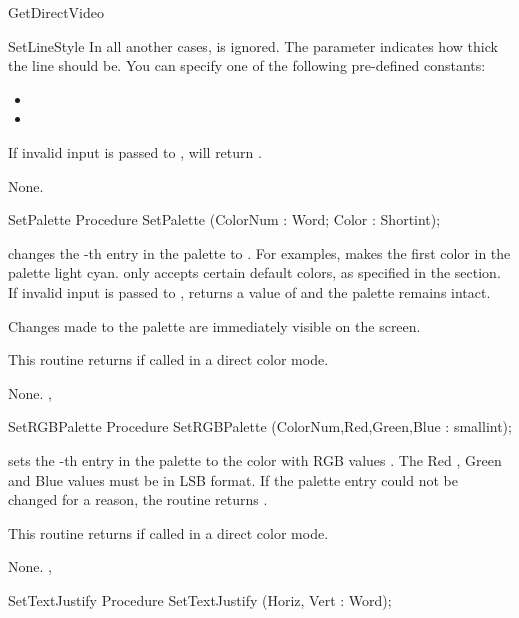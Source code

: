 \begin{function}{GetDirectVideo}
\begin{procedure}{SetLineStyle}
In all another cases,  is ignored. The parameter 
indicates how thick the line should be. You can specify one of the following
pre-defined constants:
\begin{itemize}
\item {}
\item {}
\end{itemize}

If invalid input is passed to  ,  will
return .

\Errors
None.
\SeeAlso
{}
\end{procedure}
\begin{procedure}{SetPalette}
\Declaration
Procedure SetPalette (ColorNum : Word; Color : Shortint);

\Description
{} changes the -th entry in the palette to
. For examples,  makes the first
color in the palette light cyan.  only accepts certain default
colors, as specified in the  section. If invalid
input is passed to ,  returns a value
of  and the palette remains intact.

Changes made to the palette are immediately visible on the screen.

This routine returns  if called in a direct color mode.

\Errors
None.
\SeeAlso
{},
\end{procedure}
\begin{procedure}{SetRGBPalette}
\Declaration
Procedure SetRGBPalette (ColorNum,Red,Green,Blue : smallint);

\Description
{} sets the -th entry in the palette to the
color with RGB values . The Red , Green and Blue values
must be in LSB format. If the palette entry could not be changed for a
reason, the routine returns .

This routine returns  if called in a direct color mode.

\Errors
None.
\SeeAlso
{},
\end{procedure}
\begin{procedure}{SetTextJustify}
\Declaration
Procedure SetTextJustify (Horiz, Vert : Word);


\end{procedure}
\end{function}
